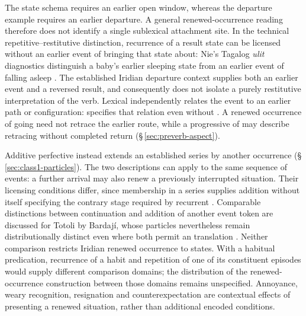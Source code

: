 The state schema requires an earlier open window, whereas the departure example
requires an earlier departure. A general renewed-occurrence reading therefore
does not identify a single sublexical attachment site. In the technical
repetitive--restitutive distinction, recurrence of a result state can be
licensed without an earlier event of bringing that state about: Nie's
Tagalog \textit{ulit} diagnostics distinguish a baby's earlier sleeping state
from an earlier event of falling asleep
\cite[§4.1, pp.~118--120, examples~47--50]{nie2020causatives}.
The established Iridian departure context supplies both an earlier event and
a reversed result, and consequently does not isolate a purely restitutive
interpretation of the verb. Lexical  independently relates the event
to an earlier path or configuration:   specifies that relation even without . A renewed occurrence
of going need not retrace the earlier route, while a progressive of
 may describe retracing without completed return
(§\,\ref{sec:preverb-aspect}).

Additive perfective  instead extends an established series by another
occurrence (§\,\ref{sec:class1-particles}). The two descriptions can apply to
the same sequence of events: a further arrival may also renew a previously
interrupted situation. Their licensing conditions differ, since membership
in a series supplies addition without itself specifying the contrary stage
required by recurrent . Comparable distinctions between
continuation and addition of another event token are discussed for Totoli by
Bardají, whose particles nevertheless remain distributionally distinct even
where both permit an  translation
\cite[§§3.1, 3.3]{bardaji2025phasal}. Neither comparison restricts Iridian
renewed occurrence to states. With a habitual predication, recurrence of a
habit and repetition of one of its constituent episodes would supply
different comparison domains; the distribution of the renewed-occurrence
construction between those domains remains unspecified. Annoyance, weary
recognition, resignation and counterexpectation are contextual effects of
presenting a renewed situation, rather than additional encoded conditions.

